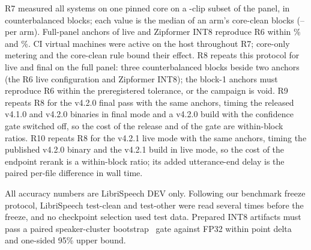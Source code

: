  R7 measured all \RsevenArms{} systems on one pinned core on a
\RsevenClips-clip subset of the panel, in \RsevenBlocks{} counterbalanced blocks; each value is the median
of an arm's core-clean blocks (\RsevenCleanMin--\RsevenCleanMax{} per arm). Full-panel anchors of
\ultra{} live and Zipformer INT8 reproduce R6 within \RsevenAnchorLivePct\% and \RsevenAnchorZipPct\%.
CI virtual machines were active on the host throughout R7; core-only metering and the core-clean rule
bound their effect. R8 repeats this protocol for \ultra{} live and final on the full panel: three counterbalanced
blocks beside two anchors (the R6 \ultra{} live configuration and Zipformer INT8); the block-1 anchors must reproduce R6
within the preregistered tolerance, or the campaign is void. R9 repeats R8 for the v4.2.0 final pass with the same
anchors, timing the released v4.1.0 and v4.2.0 binaries in final mode and a v4.2.0 build with the confidence gate
switched off, so the cost of the release and of the gate are within-block ratios. R10 repeats R8 for the v4.2.1
live mode with the same anchors, timing the published v4.2.0 binary and the v4.2.1 build in live mode, so the cost of
the endpoint rerank is a within-block ratio; its added utterance-end delay is the paired per-file difference in wall time.

 All accuracy numbers are LibriSpeech DEV only. Following our
benchmark freeze protocol, LibriSpeech test-clean and test-other were read several times before the
freeze, and no checkpoint selection used test data. Prepared INT8 artifacts must pass a paired
speaker-cluster bootstrap~\cite{bisani2004bootstrap} gate against FP32 within \PreregDeltaPP\pp point
delta and \PreregUpperPP\pp one-sided 95\% upper bound.
